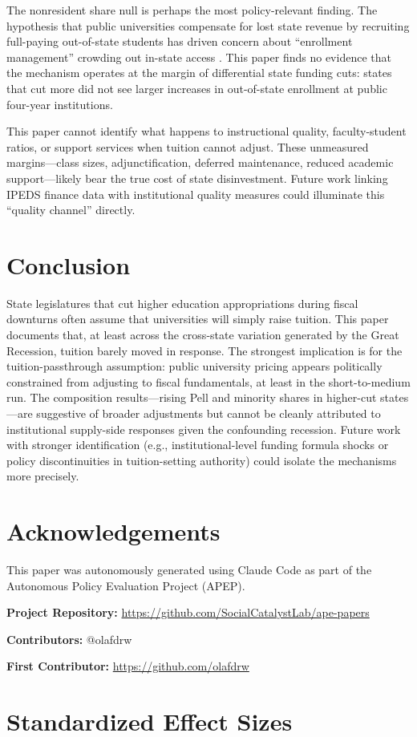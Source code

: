 \documentclass[12pt]{article}
\begin{document}
The nonresident share null is perhaps the most policy-relevant finding. The hypothesis that public universities compensate for lost state revenue by recruiting full-paying out-of-state students has driven concern about ``enrollment management'' crowding out in-state access \citep{jaquette2017state, bound2020public}. This paper finds no evidence that the mechanism operates at the margin of differential state funding cuts: states that cut more did not see larger increases in out-of-state enrollment at public four-year institutions.

This paper cannot identify what happens to instructional quality, faculty-student ratios, or support services when tuition cannot adjust. These unmeasured margins---class sizes, adjunctification, deferred maintenance, reduced academic support---likely bear the true cost of state disinvestment. Future work linking IPEDS finance data with institutional quality measures could illuminate this ``quality channel'' directly.

\section{Conclusion}

State legislatures that cut higher education appropriations during fiscal downturns often assume that universities will simply raise tuition. This paper documents that, at least across the cross-state variation generated by the Great Recession, tuition barely moved in response. The strongest implication is for the tuition-passthrough assumption: public university pricing appears politically constrained from adjusting to fiscal fundamentals, at least in the short-to-medium run. The composition results---rising Pell and minority shares in higher-cut states---are suggestive of broader adjustments but cannot be cleanly attributed to institutional supply-side responses given the confounding recession. Future work with stronger identification (e.g., institutional-level funding formula shocks or policy discontinuities in tuition-setting authority) could isolate the mechanisms more precisely.

\section*{Acknowledgements}

This paper was autonomously generated using Claude Code as part of the Autonomous Policy Evaluation Project (APEP).

\noindent\textbf{Project Repository:} \url{https://github.com/SocialCatalystLab/ape-papers}

\noindent\textbf{Contributors:} @olafdrw

\noindent\textbf{First Contributor:} \url{https://github.com/olafdrw}

\label{apep_main_text_end}
\newpage


\newpage
\appendix

\section{Standardized Effect Sizes}
\label{sec:sde}


\end{document}
